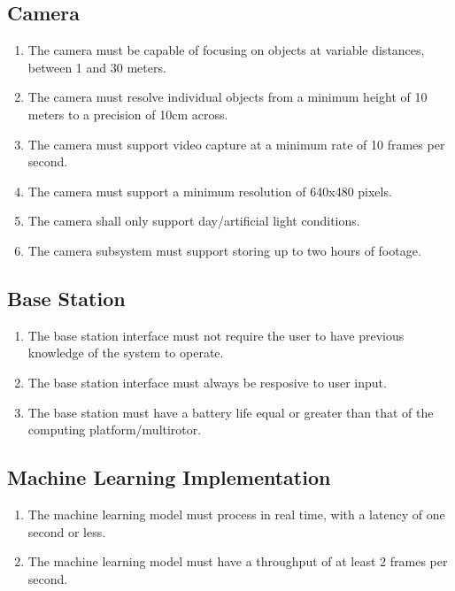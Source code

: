 \documentclass[10pt,letterpaper]{article}
\begin{document}
\subsection{Camera}
\begin{enumerate}[label=NF.CAM.\arabic*, wide=1cm, widest=3cm, leftmargin=*, font=\bfseries, noitemsep,topsep=0pt, parsep=4pt, partopsep=0pt]
	\item The camera must be capable of focusing on objects at variable distances, between 1 and 30 meters.
	\item The camera must resolve individual objects from a minimum height of 10 meters to a precision of 10cm across.
	\item The camera must support video capture at a minimum rate of 10 frames per second.
	\item The camera must support a minimum resolution of 640x480 pixels.
	\item The camera shall only support day/artificial light conditions.
	\item The camera subsystem must support storing up to two hours of footage.
\end{enumerate}

\subsection{Base Station}
\begin{enumerate}[label=NF.BS.\arabic*, wide=1cm, widest=3cm, leftmargin=*, font=\bfseries, noitemsep,topsep=0pt, parsep=4pt, partopsep=0pt]
	\item The base station interface must not require the user to have previous knowledge of the system to operate.
	\item The base station interface must always be resposive to user input.
	\item The base station must have a battery life equal or greater than that of the computing platform/multirotor.
\end{enumerate}

\subsection{Machine Learning Implementation}
\begin{enumerate}[label=NF.ML.\arabic*, wide=1cm, widest=3cm, leftmargin=*, font=\bfseries, noitemsep,topsep=0pt, parsep=4pt, partopsep=0pt]
	\item The machine learning model must process in real time, with a latency of one second or less.
	\item The machine learning model must have a throughput of at least 2 frames per second.
\end{enumerate}
\end{document}
